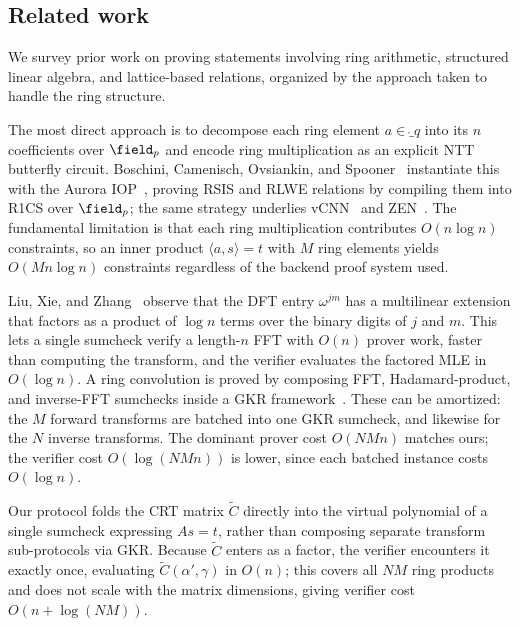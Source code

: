 \subsection{Related work}
\label{sec:ml-related-work}

We survey prior work on proving statements involving ring arithmetic, structured linear algebra, and lattice-based relations, organized by the approach taken to handle the ring structure.

The most direct approach is to decompose each ring element $a \in \ring_q$ into its $n$ coefficients over $\field_p$ and encode ring multiplication as an explicit NTT butterfly circuit.  Boschini, Camenisch, Ovsiankin, and Spooner~\cite{PQCRYPTO:BCOS20} instantiate this with the Aurora IOP~\cite{EC:BCRSVW19}, proving RSIS and RLWE relations by compiling them into R1CS over $\field_p$; the same strategy underlies vCNN~\cite{EPRINT:LKKO20} and ZEN~\cite{EPRINT:FQZDC21}. The fundamental limitation is that each ring multiplication contributes $O(n \log n)$ constraints, so an inner product $\langle a, s \rangle = t$ with $M$ ring elements yields $O(Mn \log n)$ constraints regardless of the backend proof system used.

Liu, Xie, and Zhang~\cite{CCS:LiuXieZha21} observe that the DFT entry $\omega^{jm}$ has a multilinear extension that factors as a product of $\log n$ terms over the binary digits of $j$ and $m$. This lets a single sumcheck verify a length-$n$ FFT with $O(n)$ prover work, faster than computing the transform, and the verifier evaluates the factored MLE in $O(\log n)$. A ring convolution is proved by composing FFT, Hadamard-product, and inverse-FFT sumchecks inside a GKR framework~\cite{JACM:GolKalRot15}.  These can be amortized: the $M$ forward transforms are batched into one GKR sumcheck, and likewise for the $N$ inverse transforms. The dominant prover cost $O(NMn)$ matches ours; the verifier cost $O(\log(NMn))$ is lower, since each batched instance costs $O(\log n)$.

Our protocol folds the CRT matrix $\tilde{C}$ directly into the virtual polynomial of a single sumcheck expressing $As = t$, rather than composing separate transform sub-protocols via GKR.  Because $\tilde{C}$ enters as a factor, the verifier encounters it exactly once, evaluating $\tilde{C}(\alpha', \gamma)$ in $O(n)$; this covers all $NM$ ring products and does not scale with the matrix dimensions, giving verifier cost $O(n + \log(NM))$.

